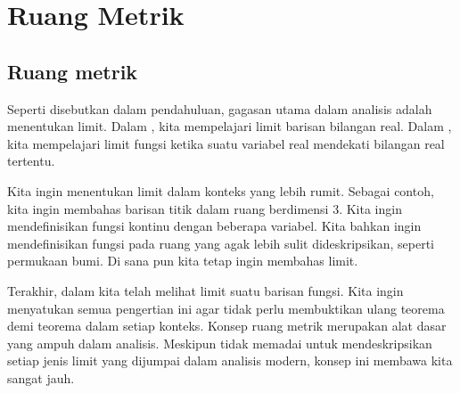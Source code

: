 \chapter{Ruang Metrik} \label{ms:chapter}


\section{Ruang metrik}
\label{sec:metric}


Seperti disebutkan dalam pendahuluan, gagasan utama dalam analisis adalah
menentukan limit.  Dalam , kita mempelajari limit
barisan bilangan real.  Dalam , kita mempelajari limit
fungsi ketika suatu variabel real mendekati bilangan real tertentu.

Kita ingin menentukan limit dalam konteks yang lebih rumit.  Sebagai
contoh, kita ingin membahas barisan titik dalam ruang berdimensi 3.
Kita ingin mendefinisikan fungsi kontinu dengan beberapa variabel.
Kita bahkan ingin mendefinisikan fungsi pada ruang yang agak lebih sulit
dideskripsikan, seperti permukaan bumi.  Di sana pun kita tetap ingin
membahas limit.

Terakhir, dalam  kita telah melihat limit suatu
barisan fungsi.
Kita ingin menyatukan semua pengertian ini agar tidak perlu
membuktikan ulang teorema demi teorema dalam setiap konteks.  Konsep
ruang metrik merupakan alat dasar yang ampuh dalam analisis.
Meskipun tidak memadai untuk mendeskripsikan setiap jenis limit yang
dijumpai dalam analisis modern, konsep ini membawa kita sangat jauh.

